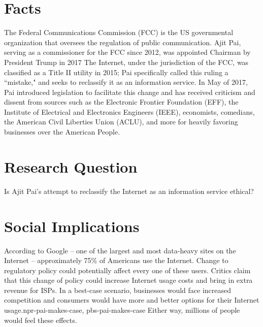 \documentclass[12pt]{article}
\begin{document}
\newpage
\begin{multicols}{2}
\setcounter{page}{1}

\section{Facts}
The Federal Communications Commission (FCC) is the US governmental organization that oversees the regulation of public communication.\cite{cnn-fcc} Ajit Pai, serving as a commissioner for the FCC since 2012, was appointed Chairman by President Trump in 2017\cite{fcc-pai-page} The Internet, under the jurisdiction of the FCC, was classified as a Title II utility in 2015; Pai specifically called this ruling a ``mistake," and seeks to reclassify it as an information service.\cite{cnn-fcc, fortune-regulation} In May of 2017, Pai introduced legislation to facilitate this change and has received criticism and dissent from sources such as the Electronic Frontier Foundation (EFF), the Institute of Electrical and Electronics Engineers (IEEE), economists, comedians, the American Civil Liberties Union (ACLU), and more for heavily favoring businesses over the American People.\cite{eff-pro-net, ieee-article, oliver, aclu}


\section{Research Question}
Is Ajit Pai's attempt to reclassify the Internet as an information service ethical?


\section{Social Implications}
According to Google -- one of the largest and most data-heavy sites on the Internet -- approximately 75\% of Americans use the Internet.\cite{google-stats} Change to regulatory policy could potentially affect every one of these users. Critics claim that this change of policy could increase Internet usage costs and bring in extra revenue for ISPs.\cite{eff-pro-net, ieee-article, aclu} In a best-case scenario, businesses would face increased competition and consumers would have more and better options for their Internet usage.{npr-pai-makes-case, pbs-pai-makes-case} Either way, millions of people would feel these effects.


\end{multicols}
\end{document}
